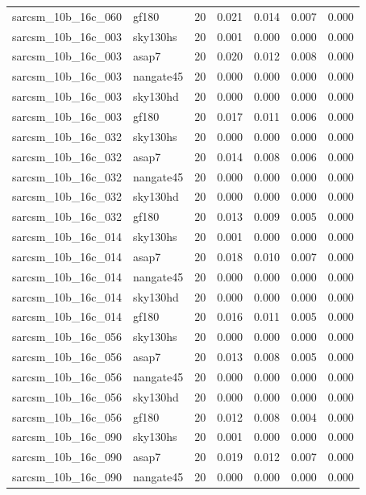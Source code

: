\begin{tabular}{llrrrrr}
sarcsm\_10b\_16c\_060 & gf180 & 20 & 0.021 & 0.014 & 0.007 & 0.000 \\
sarcsm\_10b\_16c\_003 & sky130hs & 20 & 0.001 & 0.000 & 0.000 & 0.000 \\
sarcsm\_10b\_16c\_003 & asap7 & 20 & 0.020 & 0.012 & 0.008 & 0.000 \\
sarcsm\_10b\_16c\_003 & nangate45 & 20 & 0.000 & 0.000 & 0.000 & 0.000 \\
sarcsm\_10b\_16c\_003 & sky130hd & 20 & 0.000 & 0.000 & 0.000 & 0.000 \\
sarcsm\_10b\_16c\_003 & gf180 & 20 & 0.017 & 0.011 & 0.006 & 0.000 \\
sarcsm\_10b\_16c\_032 & sky130hs & 20 & 0.000 & 0.000 & 0.000 & 0.000 \\
sarcsm\_10b\_16c\_032 & asap7 & 20 & 0.014 & 0.008 & 0.006 & 0.000 \\
sarcsm\_10b\_16c\_032 & nangate45 & 20 & 0.000 & 0.000 & 0.000 & 0.000 \\
sarcsm\_10b\_16c\_032 & sky130hd & 20 & 0.000 & 0.000 & 0.000 & 0.000 \\
sarcsm\_10b\_16c\_032 & gf180 & 20 & 0.013 & 0.009 & 0.005 & 0.000 \\
sarcsm\_10b\_16c\_014 & sky130hs & 20 & 0.001 & 0.000 & 0.000 & 0.000 \\
sarcsm\_10b\_16c\_014 & asap7 & 20 & 0.018 & 0.010 & 0.007 & 0.000 \\
sarcsm\_10b\_16c\_014 & nangate45 & 20 & 0.000 & 0.000 & 0.000 & 0.000 \\
sarcsm\_10b\_16c\_014 & sky130hd & 20 & 0.000 & 0.000 & 0.000 & 0.000 \\
sarcsm\_10b\_16c\_014 & gf180 & 20 & 0.016 & 0.011 & 0.005 & 0.000 \\
sarcsm\_10b\_16c\_056 & sky130hs & 20 & 0.000 & 0.000 & 0.000 & 0.000 \\
sarcsm\_10b\_16c\_056 & asap7 & 20 & 0.013 & 0.008 & 0.005 & 0.000 \\
sarcsm\_10b\_16c\_056 & nangate45 & 20 & 0.000 & 0.000 & 0.000 & 0.000 \\
sarcsm\_10b\_16c\_056 & sky130hd & 20 & 0.000 & 0.000 & 0.000 & 0.000 \\
sarcsm\_10b\_16c\_056 & gf180 & 20 & 0.012 & 0.008 & 0.004 & 0.000 \\
sarcsm\_10b\_16c\_090 & sky130hs & 20 & 0.001 & 0.000 & 0.000 & 0.000 \\
sarcsm\_10b\_16c\_090 & asap7 & 20 & 0.019 & 0.012 & 0.007 & 0.000 \\
sarcsm\_10b\_16c\_090 & nangate45 & 20 & 0.000 & 0.000 & 0.000 & 0.000 \\

\end{tabular}
